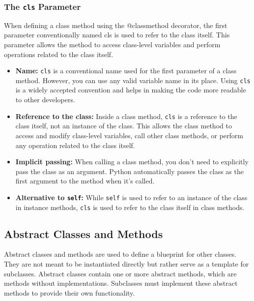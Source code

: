 \subsubsection{The \texttt{cls} Parameter}
When defining a class method using the @classmethod decorator, the first parameter conventionally named cls is used to refer to the class itself. This parameter allows the method to access class-level variables and perform operations related to the class itself.

\begin{itemize}
    \item \textbf{Name:} \texttt{cls} is a conventional name used for the first parameter of a class method. However, you can use any valid variable name in its place. Using \texttt{cls} is a widely accepted convention and helps in making the code more readable to other developers.

    \item \textbf{Reference to the class:} Inside a class method, \texttt{cls} is a reference to the class itself, not an instance of the class. This allows the class method to access and modify class-level variables, call other class methods, or perform any operation related to the class itself.

    \item \textbf{Implicit passing:} When calling a class method, you don't need to explicitly pass the class as an argument. Python automatically passes the class as the first argument to the method when it's called.

    \item \textbf{Alternative to \texttt{self}:} While \texttt{self} is used to refer to an instance of the class in instance methods, \texttt{cls} is used to refer to the class itself in class methods.
\end{itemize}

\newpage
\subsection{Abstract Classes and Methods}

Abstract classes and methods are used to define a blueprint for other classes. They are not meant to be instantiated directly but rather serve as a template for subclasses. Abstract classes contain one or more abstract methods, which are methods without implementations. Subclasses must implement these abstract methods to provide their own functionality.

